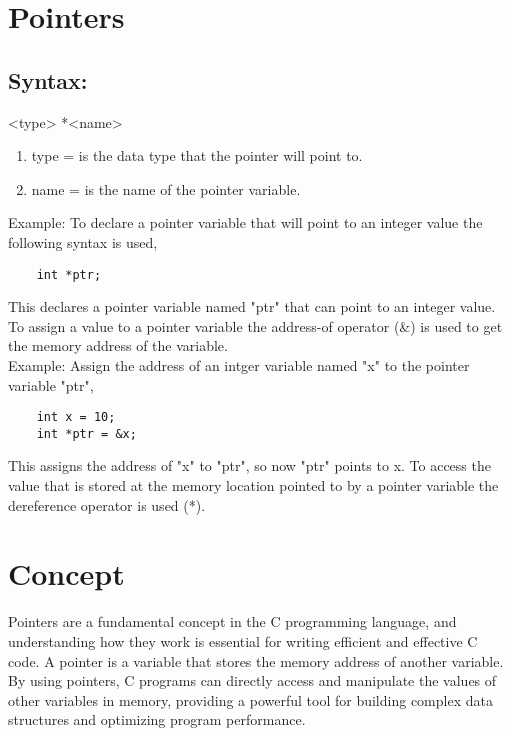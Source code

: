 \documentclass[
	12pt, %
]{fphw}
\begin{document}
\section*{Pointers}

\begin{problem}
	\subsection*{Syntax:}
	<type> *<name>
\end{problem}

\vspace{0.25cm}

\begin{enumerate}
	\item type = is the data type that the pointer will point to.
	\item name = is the name of the pointer variable.
\end{enumerate}

\lstset{language=C}


Example:
To declare a pointer variable that will point to an integer value the 
following syntax is used,
\begin{lstlisting}
	int *ptr;
\end{lstlisting}
This declares a pointer variable named "ptr" that can point to an integer 
value.\\

To assign  a value to a pointer variable the address-of operator (\&) is used 
to get the memory address of the variable.\\

Example:
Assign the address of an intger variable named "x" to the pointer variable 
"ptr",
\begin{lstlisting}
	int x = 10;
	int *ptr = &x;
\end{lstlisting}
This assigns the address of "x" to "ptr", so now "ptr" points to x.
To access the value that is stored at the memory location pointed to by a
pointer variable the dereference operator is used (*).\\

\section*{Concept}
Pointers are a fundamental concept in the C programming language, 
and understanding how they work is essential for writing efficient and 
effective C code. A pointer is a variable that stores the memory address of 
another variable. By using pointers, C programs can directly access and 
manipulate the values of other variables in memory, providing a powerful tool 
for building complex data structures and optimizing program performance.\\
\end{document}
